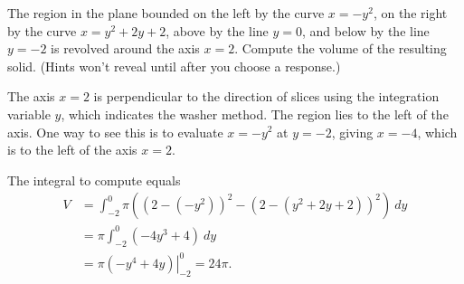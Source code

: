 \documentclass{ximera}
\begin{document}
\begin{question}%

The region in the plane bounded on the left by the curve \(x=-y^2\), on the right by the curve \(x=y^2+2y+2\), above by the line  \(y = 0\), and below by the line \(y = -2\) is revolved around the axis \(x = 2\). Compute the volume of the resulting solid.
(Hints won't reveal until after you choose a response.)
\begin{multiplechoice}
\choice{\(16\pi\)}
\choice{\(20\pi\)}
\choice[correct]{\(24\pi\)}
\choice{\(28\pi\)}
\choice{\(32\pi\)}
\choice{\(36\pi\)}
\end{multiplechoice}
\begin{feedback}
The axis \(x = 2\) is perpendicular to the direction of slices using the integration variable \(y\), which indicates the washer method. 
 The region lies to the left of the axis. One way to see this is to evaluate \(x=-y^2\) at \(y = -2\), giving \(x = -4\), which is to the left of the axis \(x = 2\).
 \begin{hint}
The integral to compute equals \[ \begin{aligned} V &= \int_{-2}^{0}\pi \left((2-(-y^2))^2 - (2-(y^2+2y+2))^2\right)~ dy\\
& = \pi \int_{-2}^{0} (-4y^3+4)~ dy\\
& = \pi \left. \left(-y^4+4y\right) \right|_{-2}^{0} = 24\pi. \end{aligned}\]
\end{hint}
\end{feedback}

\end{question}
\end{document}
